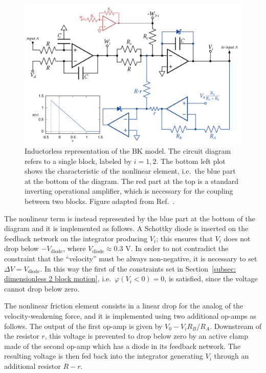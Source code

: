 \begin{figure}[!htbp]
    \centering
    \includegraphics[width=\linewidth]
    {../blocks/1_block/breadboard/breadboard_implementation.png}
    \caption{Inductorless representation of the BK model. The circuit diagram refers to a single block, labeled by $i=1,2$.
    The bottom left plot shows the characteristic of the nonlinear element, i.e.\ the blue part at the bottom of the diagram.
    The red part at the top is a standard inverting operational amplifier, which is necessary for the coupling between two blocks.
    Figure adapted from Ref.~\cite{ref:electronic_analog}.
    }\label{fig: circuit diagram}
\end{figure}

The nonlinear term is instead represented by the blue part at the bottom of the diagram and it is implemented as follows.
A Schottky diode is inserted on the feedback network on the integrator producing $V_i$; this ensures that $V_i$ does not
drop below $-V_{\text{diode}}$, where $V_{\text{diode}}\approx 0.3$ V. In order to not contradict the constraint
that the ``velocity'' must be always non-negative, it is necessary to set $\Delta V = V_{\text{diode}}$.
In this way the first of the constraints set in Section~\ref{subsec: dimensionless 2 block motion}, i.e.\ $\varphi(V_i < 0 )=0$,
is satisfied, since the voltage cannot drop below zero.

The nonlinear friction element consists in a linear drop for the analog of the velocity-weakening force, and it is
implemented using two additional op-amps as follows. The output of the first op-amp is given by $V_0-V_i R_B/R_A$.
Downstream of the resistor $r$, this voltage is prevented to drop below zero by an active
clamp made of the second op-amp which has a diode in its feedback network. The resulting voltage is then fed back into
the integrator generating $V_i$ through an additional resistor $R-r$.


